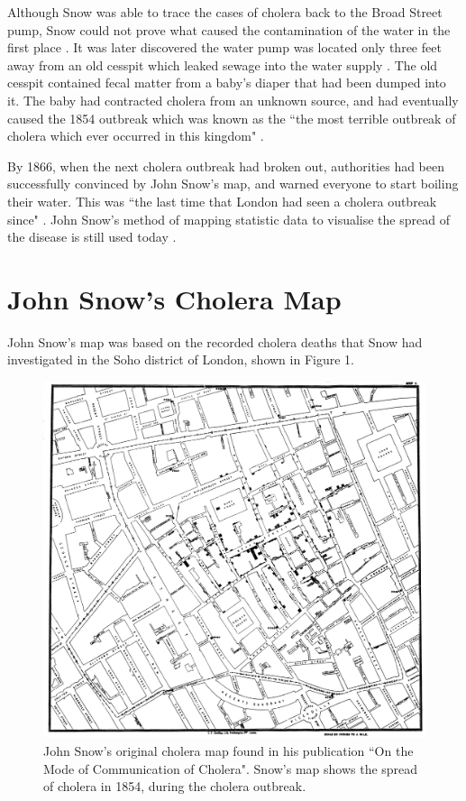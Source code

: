 \documentclass[12pt]{article}
\begin{document}
Although Snow was able to trace the cases of cholera back to the Broad Street pump, Snow could not prove what caused the contamination of the water in the first place \cite{ucla}. It was later discovered the water pump was located only three feet away from an old cesspit which leaked sewage into the water supply \cite{channel1, heros}. The old cesspit contained fecal matter from a baby's diaper that had been dumped into it. The baby had contracted cholera from an unknown source, and had eventually caused the 1854 outbreak which was known as the ``the most terrible outbreak of cholera which ever occurred in this kingdom" \cite{ucla, heros, tedtalk, johnson}. 

By 1866, when the next cholera outbreak had broken out, authorities had been successfully convinced by John Snow's map, and warned everyone to start boiling their water. This was ``the last time that London had seen a cholera outbreak since" \cite{tedtalk}. John Snow's method of mapping statistic data to visualise the spread of the disease is still used today \cite{channel1}. 

\section{John Snow's Cholera Map}

John Snow's map was based on the recorded cholera deaths that Snow had investigated in the Soho district of London, shown in Figure 1.

\begin{figure}
\centering
\vspace*{-3cm}
\hspace*{-3cm} 
\includegraphics[scale=0.183]{Snow-cholera-map-1}
\caption{John Snow's original cholera map found in his publication ``On the Mode of Communication of Cholera". Snow's map shows the spread of cholera in 1854, during the cholera outbreak. }
\label{fig:snow}
\end{figure}
\end{document}
